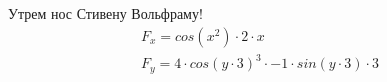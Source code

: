 \documentclass{article}
\begin{document}
\par Утрем нос Стивену Вольфраму!
\begin{gather*}
F_{x} = cos\left(x ^ {2}\right) \cdot 2 \cdot x\\
F_{y} = 4 \cdot cos\left(y \cdot 3\right) ^ {3} \cdot -1 \cdot sin\left(y \cdot 3\right) \cdot 3\\
\end{gather*}
\end{document}
